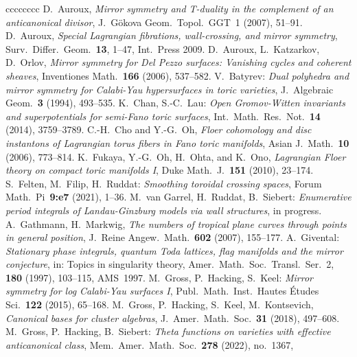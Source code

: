 \documentclass[11pt,letter]{amsart}
\theoremstyle{definition}
\theoremstyle{remark}
\numberwithin{equation}{section}
\numberwithin{figure}{section}
\begin{document}
\begin{thebibliography}{cccccccc}
 D.\ Auroux,
	\emph{Mirror symmetry and T-duality in the complement of an
	anticanonical divisor},
	J.\ G\"okova Geom.\ Topol.\ GGT~1 (2007), 51--91.
 D.\ Auroux,
	\emph{Special Lagrangian fibrations, wall-crossing, and mirror
	symmetry},
	Surv.\ Differ.\ Geom.~\textbf{13}, 1--47, Int.\ Press 2009. 
 D.\ Auroux, L.\ Katzarkov, D.\ Orlov,
	\emph{Mirror symmetry for Del Pezzo surfaces: Vanishing cycles
	and coherent sheaves},
	Inventiones Math.~\textbf{166} (2006), 537--582.
 V.~Batyrev:
	\emph{Dual polyhedra and mirror symmetry for Calabi-Yau hypersurfaces
	in toric varieties},
	J.\ Algebraic Geom.~\textbf{3} (1994), 493--535.
 K.~Chan, S.-C.~Lau:
	\emph{Open Gromov-Witten invariants and superpotentials for semi-Fano toric
	surfaces},
	Int.\ Math.\ Res.\ Not.~\textbf{14} (2014), 3759--3789.
C.-H.\ Cho and Y.-G.\ Oh,
	\emph{Floer cohomology and disc instantons of Lagrangian torus
	fibers in Fano toric manifolds},
	Asian J.\ Math.~\textbf{10} (2006), 773--814.
 K.\ Fukaya, Y.-G.\ Oh, H.\ Ohta, and K.\ Ono,
	\emph{Lagrangian Floer theory on compact toric manifolds I}, 
	 Duke Math.\ J.~\textbf{151} (2010), 23--174.
 S.\ Felten, M.\ Filip, H.\ Ruddat:
	\emph{Smoothing toroidal crossing spaces},
	Forum Math.\ Pi~\textbf{9:e7} (2021), 1--36.
 M.\ van Garrel, H.\ Ruddat, B.\ Siebert:
	\emph{Enumerative period integrals of Landau-Ginzburg models via
	wall structures}, in progress.
 A.\ Gathmann, H.\ Markwig,
	\emph{The numbers of tropical plane curves through points in general
	position},
	J.\ Reine Angew.\ Math.~\textbf{602} (2007), 155--177.
 A.\ Givental:
	\emph{Stationary phase integrals, quantum Toda lattices, flag manifolds and
	the mirror conjecture},
	in: Topics in singularity theory,  Amer.\ Math.\ Soc.\ Transl.\ Ser.~2,
	\textbf{180} (1997), 103--115, AMS~1997.
 M.~Gross, P.~Hacking, S.~Keel:
	\emph{Mirror  symmetry  for  log  Calabi-Yau  surfaces  I},
	Publ.\ Math.\ Inst.\ Hautes \'Etudes Sci.~\textbf{122} (2015), 65--168.
 M.~Gross, P.~Hacking, S.~Keel, M.~Kontsevich, 
	\emph{Canonical bases for cluster algebras},
	J.\ Amer.\ Math.\ Soc.\ {\bf 31} (2018), 497--608.
 M.~Gross, P.~Hacking, B.~Siebert:
	\emph{Theta functions on varieties with effective anticanonical class},
	Mem.\ Amer.\ Math.\ Soc.~\textbf{278} (2022), no.~1367,

\end{thebibliography}
\end{document}
